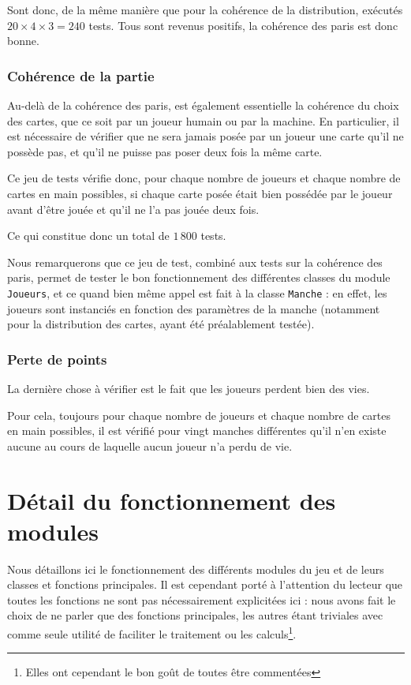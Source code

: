          Sont donc, de la même manière que pour la cohérence de la distribution, exécutés $20\times 4\times 3 = 240$ tests.
         Tous sont revenus positifs, la cohérence des paris est donc bonne.

      \subsubsection{Cohérence de la partie}
         Au-delà de la cohérence des paris, est également essentielle la cohérence du choix des cartes, que ce soit par un joueur humain ou par la machine.
         En particulier, il est nécessaire de vérifier que ne sera jamais posée par un joueur une carte qu'il ne possède pas, et qu'il ne puisse pas poser deux fois la même carte.

         Ce jeu de tests vérifie donc, pour chaque nombre de joueurs et chaque nombre de cartes en main possibles, si chaque carte posée était bien possédée par le joueur avant d'être jouée et qu'il ne l'a pas jouée deux fois.

         Ce qui constitue donc un total de $1\,800$ tests.

         Nous remarquerons que ce jeu de test, combiné aux tests sur la cohérence des paris, permet de tester le bon fonctionnement des différentes classes du module \texttt{Joueurs}, et ce quand bien même appel est fait à la classe \texttt{Manche} : en effet, les joueurs sont instanciés en fonction des paramètres de la manche (notamment pour la distribution des cartes, ayant été préalablement testée).

      \subsubsection{Perte de points}
         La dernière chose à vérifier est le fait que les joueurs perdent bien des vies.

         Pour cela, toujours pour chaque nombre de joueurs et chaque nombre de cartes en main possibles, il est vérifié pour vingt manches différentes qu'il n'en existe aucune au cours de laquelle aucun joueur n'a perdu de vie.

\section{Détail du fonctionnement des modules}\label{sec:détail-du-fonctionnement-par-module}
   Nous détaillons ici le fonctionnement des différents modules du jeu et de leurs classes et fonctions principales.
   Il est cependant porté à l'attention du lecteur que toutes les fonctions ne sont pas nécessairement explicitées ici : nous avons fait le choix de ne parler que des fonctions principales, les autres étant triviales avec comme seule utilité de faciliter le traitement ou les calculs\footnote{Elles ont cependant le bon goût de toutes être commentées}.
